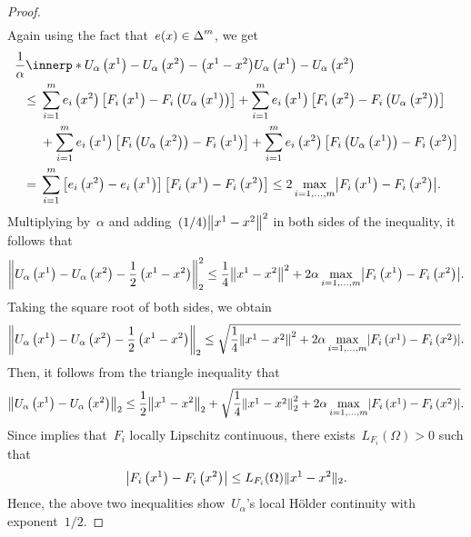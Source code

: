 \documentclass[../../main]{subfiles}
\begin{document}
\begin{proof}
\begin{align}
    \end{align}
    Again using the fact that~$e(x) \in \simplex^m$, we get
    \begin{align}
        \MoveEqLeft \frac{1}{\alpha} \innerp*{U_\alpha\left(x^1\right) - U_\alpha\left(x^2\right) - \left(x^1 - x^2\right)}{U_\alpha\left(x^1\right) - U_\alpha\left(x^2\right)} \\
        \le{}& \sum_{i = 1}^{m} e_i\left(x^2\right) \left[ F_i\left(x^1\right) - F_i\left(U_\alpha\left(x^1\right)\right) \right] + \sum_{i = 1}^{m} e_i\left(x^1\right) \left[ F_i\left(x^2\right) - F_i\left(U_\alpha\left(x^2\right)\right) \right] \\
           &+ \sum_{i = 1}^{m} e_i\left(x^1\right) \left[ F_i\left(U_\alpha\left(x^2\right)\right) - F_i\left(x^1\right) \right] + \sum_{i = 1}^{m} e_i\left(x^2\right) \left[ F_i\left(U_\alpha\left(x^1\right)\right) - F_i\left(x^2\right) \right] \\
        ={}& \sum_{i = 1}^{m} \left[ e_i\left(x^2\right) - e_i\left(x^1\right) \right] \left[ F_i\left(x^1\right) - F_i\left(x^2\right) \right] 
        \le 2 \max_{i = 1, \dots, m} \abs*{F_i\left(x^1\right) - F_i\left(x^2\right)}
    .\end{align}
    Multiplying by~$\alpha$ and adding~$(1 / 4) \norm*{x^1 - x^2}^2$ in both sides of the inequality, it follows that
    \begin{equation}
        \norm*{U_\alpha\left(x^1\right) - U_\alpha\left(x^2\right) - \frac{1}{2} \left( x^1 - x^2 \right) }_2^2 \le \frac{1}{4} \norm*{x^1 - x^2}^2 + 2 \alpha \max_{i = 1, \dots, m} \abs*{F_i\left(x^1\right) - F_i\left(x^2\right)}
    .\end{equation} 
    Taking the square root of both sides, we obtain
    \begin{equation}
        \norm*{U_\alpha\left(x^1\right) - U_\alpha\left(x^2\right) - \frac{1}{2} \left( x^1 - x^2 \right) }_2 \le \sqrt{\frac{1}{4} \norm*{x^1 - x^2}^2 + 2 \alpha \max_{i = 1, \dots, m} \abs*{F_i\left(x^1\right) - F_i\left(x^2\right)}}
    .\end{equation} 
    Then, it follows from the triangle inequality that
    \begin{equation}
        \norm*{U_\alpha\left(x^1\right) - U_\alpha\left(x^2\right)}_2 \le \frac{1}{2} \norm*{x^1 - x^2}_2 + \sqrt{\frac{1}{4} \norm*{x^1 - x^2}_2^2 + 2 \alpha \max_{i = 1, \dots, m} \abs*{F_i\left(x^1\right) - F_i\left(x^2\right)}}
    .\end{equation} 
    Since  implies that~$F_i$ locally Lipschitz continuous, there exists~$L_{F_i}(\Omega) > 0$ such that
    \begin{equation} \label{eq:cont_u_alpha:local_Lipschitz}
        \abs*{F_i\left(x^1\right) - F_i\left(x^2\right)} \le L_{F_i}(\Omega) \norm{x^1 - x^2}_2
    .\end{equation} 
    Hence, the above two inequalities show~$U_\alpha$'s local H\"older continuity with exponent~$1 / 2$.


\end{proof}
\end{document}
